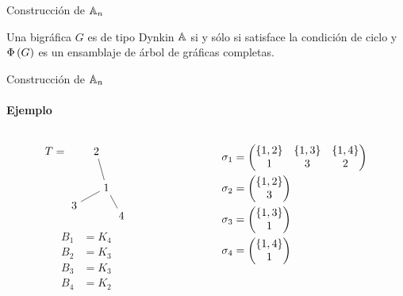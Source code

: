 \documentclass[spanish]{beamer}
\begin{document}
\begin{frame}{Construcción de $\mathbb{A}_n$}
  \begin{theorem}[M. Barot -- 1999]
    Una bigráfica $G$ es de tipo Dynkin $\mathbb{A}$ si y sólo si satisface la 
    condición de ciclo y $\Phi\left({G}\right)$ es un ensamblaje de árbol de gráficas 
    completas.
  \end{theorem}
\end{frame}

\begin{frame}{Construcción de $\mathbb{A}_n$}
  \framesubtitle{Ejemplo}
  \begin{columns}
    \begin{column}{0.5\textwidth}
      \begin{equation*}
        T =
        \begin{tikzpicture}[scale = 0.8, baseline = (B2.base)]
          \node (B1) at (0.9882314470711424, 0.022706017651931643) {$1$};
          \node (B2) at (0.5923935348744648, 1.4508406462539858) {$2$};
          \node (B3) at (-0.2884249194391753, -0.6784940273952205) {$3$};
          \node (B4) at (1.5875974862305025, -1.0893921745565085) {$4$};
          \draw (B2) -- (B1) -- (B3);
          \draw (B1) -- (B4);
        \end{tikzpicture}
      \end{equation*}
      \begin{align*}
        B_1 &= K_4\\
        B_2 &= K_3\\
        B_3 &= K_3\\
        B_4 &= K_2\\
      \end{align*}
    \end{column}
    \begin{column}{0.5\textwidth}
      \begin{align*}
        \sigma_1 &= \begin{pmatrix}
          \left\{{1, 2}\right\} & \left\{{1, 3}\right\} & \left\{{1, 4}\right\}\\
          1          & 3          & 2\\
        \end{pmatrix}\\
        \sigma_2 &= \begin{pmatrix}
          \left\{{1, 2}\right\}\\
          3
        \end{pmatrix}\\
        \sigma_3 &= \begin{pmatrix}
          \left\{{1, 3}\right\}\\
          1
        \end{pmatrix}\\
        \sigma_4 &= \begin{pmatrix}
          \left\{{1, 4}\right\}\\
          1
        \end{pmatrix}
      \end{align*}
    \end{column}
  \end{columns}
\end{frame}
\end{document}
